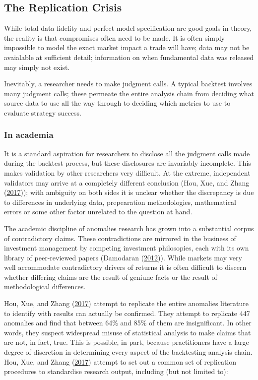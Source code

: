 \documentclass[11pt,preprint, authoryear]{elsarticle}
\numberwithin{equation}{section}
\numberwithin{figure}{section}
\numberwithin{table}{section}
\begin{document}
\subsection{The Replication Crisis}\label{the-replication-crisis}

While total data fidelity and perfect model specification are good goals
in theory, the reality is that compromises often need to be made. It is
often simply impossible to model the exact market impact a trade will
have; data may not be avaialable at sufficient detail; information on
when fundamental data was released may simply not exist.

Inevitably, a researcher needs to make judgment calls. A typical
backtest involves many judgment calls; these permeate the entire
analysis chain from deciding what source data to use all the way through
to deciding which metrics to use to evaluate strategy success.

\subsubsection{In academia}\label{in-academia}

It is a standard aspiration for researchers to disclose all the judgment
calls made during the backtest process, but these disclosures are
invariably incomplete. This makes validation by other researchers very
difficult. At the extreme, independent validators may arrive at a
completely different conclusion (Hou, Xue, and Zhang
(\protect\hyperlink{ref-Hou2017}{2017})); with ambiguity on both sides
it is unclear whether the discrepancy is due to differences in
underlying data, prepearation methodologies, mathematical errors or some
other factor unrelated to the question at hand.

The academic discipline of anomalies research has grown into a
substantial corpus of contradictory claims. These contradictions are
mirrored in the business of investment management by competing
investment philosopies, each with its own library of peer-reviewed
papers (Damodaran (\protect\hyperlink{ref-Damodaran2012}{2012})). While
markets may very well accommodate contradictory drivers of returns it is
often difficult to discern whether differing claims are the result of
geniune facts or the result of methodological differences.

Hou, Xue, and Zhang (\protect\hyperlink{ref-Hou2017}{2017}) attempt to
replicate the entire anomalies literature to identify with results can
actually be confirmed. They attempt to replicate 447 anomalies and find
that between 64\% and 85\% of them are insignificant. In other words,
they suspect widespread misuse of statistical analysis to make claims
that are not, in fact, true. This is possible, in part, because
practitioners have a large degree of discretion in determining every
aspect of the backtesting analysis chain. Hou, Xue, and Zhang
(\protect\hyperlink{ref-Hou2017}{2017}) attempt to set out a common set
of replication procedures to standardise research output, including (but
not limited to):
\end{document}
